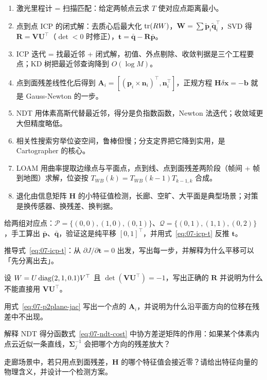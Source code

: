 \begin{summary}

\begin{enumerate}
  \item 激光里程计 = 扫描匹配：给定两帧点云求 $T$ 使对应点距离最小。
  \item 点到点 ICP 的闭式解：去质心后最大化 $\operatorname{tr}(RW)$，$\bm{W}=\sum\tilde{\bm{p}}_i\tilde{\bm{q}}_i^{\top}$，SVD 得 $\bm{R}=\bm{V}\bm{U}^{\top}$（$\det<0$ 时修正），$\bm{t}=\bar{\bm{q}}-\bm{R}\bar{\bm{p}}$。
  \item ICP 迭代 = 找最近邻 + 闭式解，初值、外点剔除、收敛判据是三个工程要点；KD 树把最近邻查询降到 $O(\log M)$。
  \item 点到面残差线性化后得到 $\bm{A}_i=[(\bm{p}_i\times\bm{n}_i)^{\top},\bm{n}_i^{\top}]$，正规方程 $\bm{H}\delta\bm{x}=-\bm{b}$ 就是 Gauss-Newton 的一步。
  \item NDT 用体素高斯代替最近邻，得分是负指数函数，Newton 法迭代；收敛域更大但精度略低。
  \item 相关性搜索穷举位姿空间，鲁棒但慢；分支定界把它降到实用，是 Cartographer 的核心。
  \item LOAM 用曲率提取边缘点与平面点，点到线、点到面残差两阶段（帧间 + 帧到地图）求解，位姿按 $T_{WB}(k)=T_{WB}(k-1)T_{k-1,k}$ 合成。
  \item 退化由信息矩阵 $\bm{H}$ 的小特征值检测，长廊、空旷、大平面是典型场景；对策是换传感器、换残差、换判据。
\end{enumerate}


\end{summary}

\begin{problemset}

  \item 给两组对应点：$\mathcal{P}=\{(0,0),(1,0),(0,1)\}$、$\mathcal{Q}=\{(0,1),(1,1),(0,2)\}$，手工算出 $\bar{\bm{p}}$、$\bar{\bm{q}}$，验证这是纯平移 $[0,1]^{\top}$，并用式~\eqref{eq:07-icp-t} 反推 $\bm{t}$。
  \item 推导式~\eqref{eq:07-icp-t}：从 $\partial J/\partial\bm{t}=0$ 出发，写出每一步，并解释为什么平移可以「先分离出去」。
  \item 设 $W=U\operatorname{diag}(2,1,0.1)V^{\top}$ 且 $\det(\bm{V}\bm{U}^{\top})=-1$，写出正确的 $\bm{R}$ 并说明为什么不能直接用 $\bm{V}\bm{U}^{\top}$。
  \item 用式~\eqref{eq:07-p2plane-jac} 写出一个点的 $\bm{A}_i$，并说明为什么沿平面方向的位移在残差中不出现。
  \item 解释 NDT 得分函数式~\eqref{eq:07-ndt-cost} 中协方差逆矩阵的作用：如果某个体素内点云近似一条直线，$\bm{\Sigma}_j^{-1}$ 会把哪个方向的残差放大？
  \item 走廊场景中，若只用点到面残差，$\bm{H}$ 的哪个特征值会接近零？请给出特征向量的物理含义，并设计一个检测方案。
\end{problemset}

